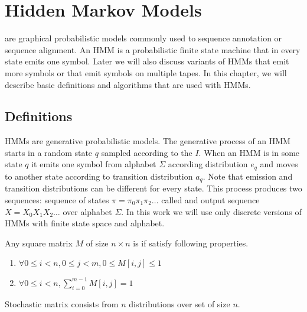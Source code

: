 \chapter{Hidden Markov Models}
\label{CHAPTER:HMM}

 are graphical probabilistic models
commonly used to sequence annotation or sequence alignment. An HMM is
a probabilistic finite state machine that in every state emits one symbol. Later
we will also discuss variants of HMMs that emit more symbols or that emit symbols on multiple
tapes. In this chapter, we will describe basic
definitions and algorithms that are used with HMMs.

\section{Definitions}\label{SECTION:HMMDEF}
                       
HMMs are generative probabilistic models.
The generative process of an HMM starts in a random state $q$ sampled according
to the  $I$.  When an HMM is in some state $q$ it emits one symbol from
alphabet $\Sigma$ according distribution $e_q$ and moves to another state
according to transition distribution $a_q$. Note that emission and transition
distributions can be different for every state.  This process produces two
sequences: sequence of states $\pi=\pi_0\pi_1\pi_2\dots$ called
 and output sequence $X=X_0X_1X_2\dots$ over alphabet
$\Sigma$. In this work we will use only discrete versions of HMMs with finite state
space and alphabet.  


\begin{definition}
Any square matrix $M$ of size $n\times n$ is  if satisfy
following properties.
\begin{enumerate}
\item $\forall 0\leq i<n,0\leq j < m, 0\leq M[i,j]\leq 1$
\item $\forall 0\le i<n, \sum_{i=0}^{m-1}M[i,j]=1$
\end{enumerate}
\end{definition}

\begin{note}
Stochastic matrix consists from $n$ distributions over set of size $n$.
\end{note}


